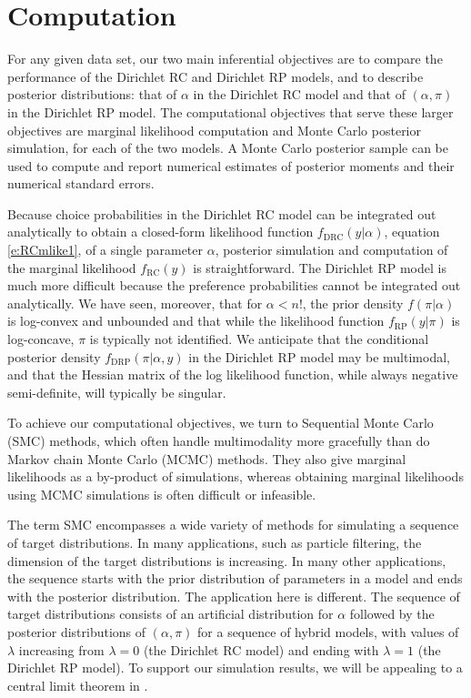 \documentclass[11pt,letter]{article}
\newcommand{\Dpi}{Dirichlet RP model}
\newcommand{\DP}{Dirichlet RC model}
\begin{document}
\section{Computation}

For any given data set, our two main inferential objectives are to compare the performance of the Dirichlet RC and Dirichlet RP models, and to describe posterior distributions: that of $\alpha$ in the \DP{} and that of $(\alpha,\pi)$ in the \Dpi{}.
The computational objectives that serve these larger objectives are marginal likelihood computation and Monte Carlo posterior simulation, for each of the two models.
A Monte Carlo posterior sample can be used to compute and report numerical estimates of posterior moments and their numerical standard errors.

Because choice probabilities in the \DP{} can be integrated out analytically to obtain a closed-form likelihood function $f_{\mathrm{DRC}}(y|\alpha)$, equation \eqref{e:RCmlike1}, of a single parameter $\alpha$, posterior simulation and computation of the marginal likelihood $f_{\mathrm{RC}}(y)$ is straightforward.
The \Dpi{} is much more difficult because the preference probabilities cannot be integrated out analytically.
We have seen, moreover, that for $\alpha < n!$, the prior density $f(\pi|\alpha)$ is log-convex and unbounded and that while the likelihood function $f_{\mathrm{RP}}(y|\pi)$ is log-concave, $\pi$ is typically not identified.
We anticipate that the conditional posterior density $f_\mathrm{DRP}(\pi|\alpha,y)$ in the \Dpi{} may be multimodal, and that the Hessian matrix of the log likelihood function, while always negative semi-definite, will typically be singular.

To achieve our computational objectives, we turn to Sequential Monte Carlo (SMC) methods, which often handle multimodality more gracefully than do Markov chain Monte Carlo (MCMC) methods.
They also give marginal likelihoods as a by-product of simulations, whereas obtaining marginal likelihoods using MCMC simulations is often difficult or infeasible.

The term SMC encompasses a wide variety of methods for simulating a sequence of target distributions.
In many applications, such as particle filtering, the dimension of the target distributions is increasing.
In many other applications, the sequence starts with the prior distribution of parameters in a model and ends with the posterior distribution.
The application here is different.
The sequence of target distributions consists of an artificial distribution for $\alpha$ followed by the posterior distributions of $(\alpha, \pi)$ for a sequence of hybrid models, with values of $\lambda$ increasing from $\lambda = 0$ (the \DP{}) and ending with $\lambda = 1$ (the \Dpi{}).
To support our simulation results, we will be appealing to a central limit theorem in .
\end{document}
